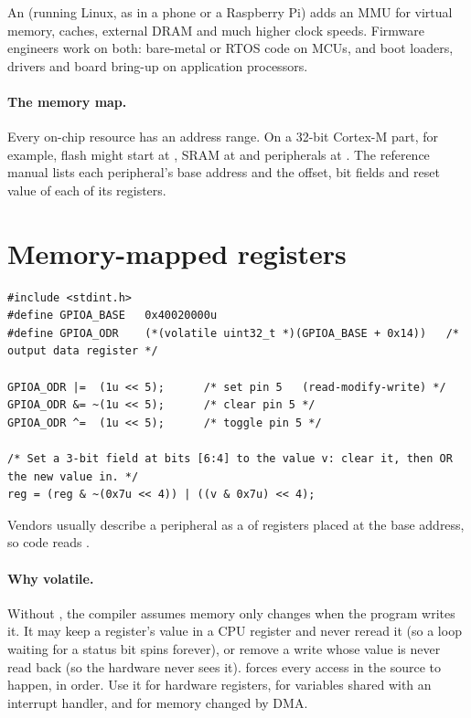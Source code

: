 An  (running Linux, as in a phone or a Raspberry Pi) adds an MMU for virtual memory, caches, external DRAM and much higher clock speeds. Firmware engineers work on both: bare-metal or RTOS code on MCUs, and boot loaders, drivers and board bring-up on application processors.

\paragraph{The memory map.} Every on-chip resource has an address range. On a 32-bit Cortex-M part, for example, flash might start at , SRAM at  and peripherals at . The reference manual lists each peripheral's base address and the offset, bit fields and reset value of each of its registers.

\section{Memory-mapped registers}

\begin{lstlisting}
#include <stdint.h>
#define GPIOA_BASE   0x40020000u
#define GPIOA_ODR    (*(volatile uint32_t *)(GPIOA_BASE + 0x14))   /* output data register */

GPIOA_ODR |=  (1u << 5);      /* set pin 5   (read-modify-write) */
GPIOA_ODR &= ~(1u << 5);      /* clear pin 5 */
GPIOA_ODR ^=  (1u << 5);      /* toggle pin 5 */

/* Set a 3-bit field at bits [6:4] to the value v: clear it, then OR the new value in. */
reg = (reg & ~(0x7u << 4)) | ((v & 0x7u) << 4);
\end{lstlisting}

Vendors usually describe a peripheral as a  of  registers placed at the base address, so code reads .

\paragraph{Why volatile.} Without , the compiler assumes memory only changes when the program writes it. It may keep a register's value in a CPU register and never reread it (so a loop waiting for a status bit spins forever), or remove a write whose value is never read back (so the hardware never sees it).  forces every access in the source to happen, in order. Use it for hardware registers, for variables shared with an interrupt handler, and for memory changed by DMA.

